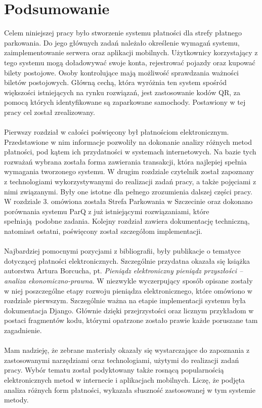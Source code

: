 \section*{Podsumowanie}

Celem niniejszej pracy było stworzenie systemu płatności dla strefy płatnego parkowania. Do jego głównych zadań należało określenie wymagań systemu, zaimplementowanie serwera oraz aplikacji mobilnych. Użytkownicy korzystający z tego systemu mogą doładowywać swoje konta, rejestrować pojazdy oraz kupować bilety postojowe. Osoby kontrolujące mają możliwość sprawdzania ważności biletów postojowych. Główną cechą, która wyróżnia ten system spośród większości istniejących na rynku rozwiązań, jest zastosowanie kodów QR, za pomocą których identyfikowane są zaparkowane samochody. Postawiony w tej pracy cel został zrealizowany.
\\
\\
Pierwszy rozdział w całości poświęcony był płatnościom elektronicznym. Przedstawione w nim informacje pozwoliły na dokonanie analizy różnych metod płatności, pod kątem ich przydatności w systemach internetowych. Na bazie tych rozważań wybrana została forma zawierania transakcji, która najlepiej spełnia wymagania tworzonego systemu. W drugim rozdziale czytelnik został zapoznany z technologiami wykorzystywanymi do realizacji zadań pracy, a także pojęciami z nimi związanymi. Były one istotne dla pełnego zrozumienia dalszej części pracy. W rozdziale 3. omówiona została Strefa Parkowania w Szczecinie oraz dokonano porównania systemu ParQ z już istniejącymi rozwiązaniami, które spełniają podobne zadania. Kolejny rozdział zawiera dokumentację techniczną, natomiast ostatni, poświęcony został szczegółom implementacji.
\\
\\
Najbardziej pomocnymi pozycjami z bibliografii, były publikacje o tematyce dotyczącej płatności elektronicznych. Szczególnie przydatna okazała się książka autorstwa Artura Borcucha, pt. \textit{Pieniądz elektroniczny pieniądz przyszłości -- analiza ekonomiczno-prawna}. W niezwykle wyczerpujący sposób opisane zostały w niej poszczególne etapy rozwoju pieniądza elektronicznego, które omówiono w rozdziale pierwszym. Szczególnie ważna na etapie implementacji systemu była dokumentacja Django. Głównie dzięki przejrzystości oraz licznym przykładom w postaci fragmentów kodu, którymi opatrzone zostało prawie każde poruszane tam zagadnienie.
\\
\\
Mam nadzieję, że zebrane materiały okazały się wystarczające do zapoznania z zastosowanymi narzędziami oraz technologiami, użytymi do realizacji zadań pracy. Wybór tematu został podyktowany także rosnącą popularnością elektronicznych metod w internecie i aplikacjach mobilnych. Liczę, że podjęta analiza różnych form płatności, wykazała słuszność zastosowanej w tym systemie metody. 